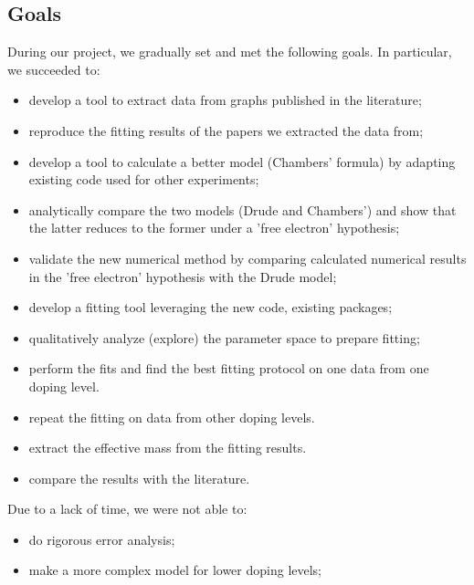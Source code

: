 \subsection{Goals}
During our project, we gradually set and met the following goals. In particular, we succeeded to: 
\begin{itemize}
	\item[\done] develop a tool to extract data from graphs published in the literature;
	\item[\done] reproduce the fitting results of the papers we extracted the data from;
	\item[\done] develop a tool to calculate a better model (Chambers' formula) by adapting existing code used for other experiments;
	\item[\done] analytically compare the two models (Drude and Chambers') and show that the latter reduces to the former under a 'free electron' hypothesis;
	\item[\done] validate the new numerical method by comparing calculated numerical results in the 'free electron' hypothesis with the Drude model;
	\item[\done] develop a fitting tool leveraging the new code, existing packages;
	\item[\done] qualitatively analyze (explore) the parameter space to prepare fitting;
	\item[\done] perform the fits and find the best fitting protocol on one data from one doping level.
	\item[\done] repeat the fitting on data from other doping levels.
	\item[\done] extract the effective mass from the fitting results.
	\item[\done] compare the results with the literature.
\end{itemize}
Due to a lack of time, we were not able to:
\begin{itemize}
	\item[\emptybox] do rigorous error analysis;
	\item[\emptybox] make a more complex model for lower doping levels;
\end{itemize}